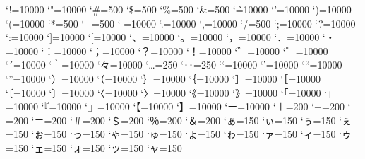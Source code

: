 \prebreakpenalty`!=10000
\prebreakpenalty`"=10000
\postbreakpenalty`\#=500
\postbreakpenalty`\$=500
\prebreakpenalty`\%=500
\prebreakpenalty`\&=500
\postbreakpenalty`\`=10000
\prebreakpenalty`'=10000
\prebreakpenalty`)=10000
\postbreakpenalty`(=10000
\prebreakpenalty`*=500
\prebreakpenalty`+=500
\prebreakpenalty`-=10000
\prebreakpenalty`.=10000
\prebreakpenalty`,=10000
\prebreakpenalty`/=500
\prebreakpenalty`;=10000
\prebreakpenalty`?=10000
\prebreakpenalty`:=10000
\prebreakpenalty`]=10000
\postbreakpenalty`[=10000
\prebreakpenalty`、=10000
\prebreakpenalty`。=10000
\prebreakpenalty`，=10000
\prebreakpenalty`．=10000
\prebreakpenalty`・=10000
\prebreakpenalty`：=10000
\prebreakpenalty`；=10000
\prebreakpenalty`？=10000
\prebreakpenalty`！=10000
\prebreakpenalty`゛=10000%
\prebreakpenalty`゜=10000%
\prebreakpenalty`´=10000%
\postbreakpenalty`｀=10000%
\prebreakpenalty`々=10000%
\prebreakpenalty`…=250%
\prebreakpenalty`‥=250%
\postbreakpenalty`‘=10000%
\prebreakpenalty`’=10000%
\postbreakpenalty`“=10000%
\prebreakpenalty`”=10000%
\prebreakpenalty`）=10000
\postbreakpenalty`（=10000
\prebreakpenalty`｝=10000
\postbreakpenalty`｛=10000
\prebreakpenalty`］=10000
\postbreakpenalty`［=10000
\postbreakpenalty`〔=10000%
\prebreakpenalty`〕=10000%
\postbreakpenalty`〈=10000%
\prebreakpenalty`〉=10000%
\postbreakpenalty`《=10000%
\prebreakpenalty`》=10000%
\postbreakpenalty`「=10000%
\prebreakpenalty`」=10000%
\postbreakpenalty`『=10000%
\prebreakpenalty`』=10000%
\postbreakpenalty`【=10000%
\prebreakpenalty`】=10000%
\prebreakpenalty`ー=10000
\prebreakpenalty`＋=200
\prebreakpenalty`−=200%
\prebreakpenalty`－=200%
\prebreakpenalty`＝=200
\postbreakpenalty`＃=200
\postbreakpenalty`＄=200
\prebreakpenalty`％=200
\prebreakpenalty`＆=200
\prebreakpenalty`ぁ=150
\prebreakpenalty`ぃ=150
\prebreakpenalty`ぅ=150
\prebreakpenalty`ぇ=150
\prebreakpenalty`ぉ=150
\prebreakpenalty`っ=150
\prebreakpenalty`ゃ=150
\prebreakpenalty`ゅ=150
\prebreakpenalty`ょ=150
\prebreakpenalty`ゎ=150%
\prebreakpenalty`ァ=150
\prebreakpenalty`ィ=150
\prebreakpenalty`ゥ=150
\prebreakpenalty`ェ=150
\prebreakpenalty`ォ=150
\prebreakpenalty`ッ=150
\prebreakpenalty`ャ=150
